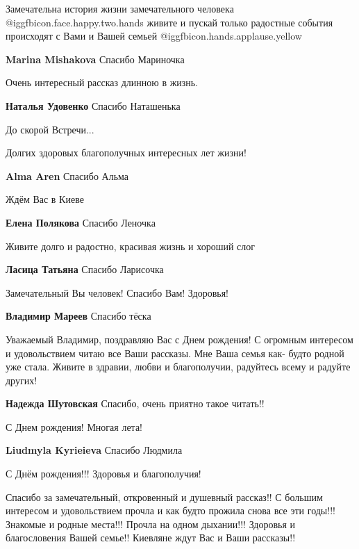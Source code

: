  
 
 
 
 


Замечательна история жизни замечательного человека
@igg{fbicon.face.happy.two.hands} живите и пускай только радостные события
происходят с Вами и Вашей семьей @igg{fbicon.hands.applause.yellow} 

\textbf{Marina Mishakova} Спасибо Мариночка

Очень интересный рассказ длинною в жизнь.


\textbf{Наталья Удовенко} Спасибо Наташенька

До скорой Встречи...

Долгих здоровых благополучных интересных лет жизни!

\textbf{Alma Aren} Спасибо Альма

Ждём Вас в Киеве

\textbf{Елена Полякова} Спасибо Леночка

Живите долго и радостно, красивая жизнь и хороший слог

\textbf{Ласица Татьяна} Спасибо Ларисочка

Замечательный Вы человек! Спасибо Вам! Здоровья!

\textbf{Владимир Мареев} Спасибо тёска


Уважаемый Владимир, поздравляю Вас с Днем рождения! С огромным интересом и
удовольствием читаю все Ваши рассказы. Мне Ваша семья как- будто родной уже
стала. Живите в здравии, любви и благополучии, радуйтесь всему и радуйте
других!

\textbf{Надежда Шутовская} Спасибо, очень приятно такое читать!!

С Днем рождения!
Многая лета!

\textbf{Liudmyla Kyrieieva} Спасибо Людмила

С Днём рождения!!! Здоровья и благополучия!


Спасибо за замечательный, откровенный и душевный рассказ!! С большим интересом и
удовольствием прочла и как будто прожила снова все эти годы!!! Знакомые и
родные места!!! Прочла на одном дыхании!!! Здоровья и благословения Вашей
семье!! Киевляне ждут Вас и Ваши рассказы!!
